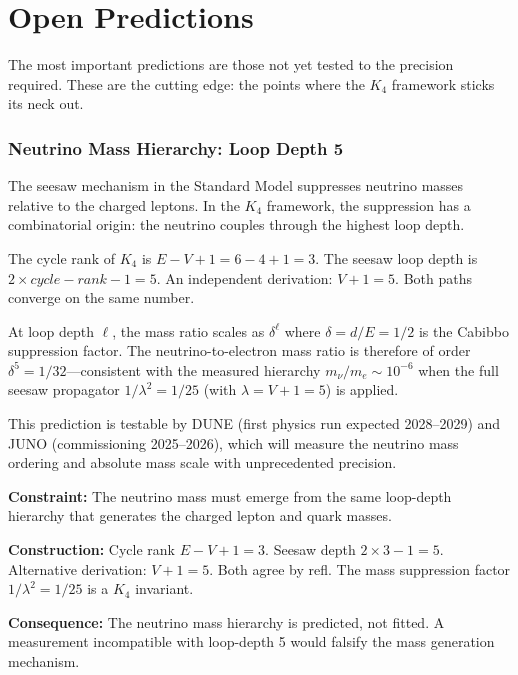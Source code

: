 \documentclass[11pt,a4paper]{book}
\def\texttt#1{#1}%
\def\text#1{#1}%
\begin{document}
\section*{Open Predictions}

The most important predictions are those not yet tested to the precision required. These are the cutting edge: the points where the $K_4$ framework sticks its neck out.

\subsubsection*{Neutrino Mass Hierarchy: Loop Depth 5}

The seesaw mechanism in the Standard Model suppresses neutrino masses relative to the charged leptons. In the $K_4$ framework, the suppression has a combinatorial origin: the neutrino couples through the highest loop depth.

The cycle rank of $K_4$ is $E - V + 1 = 6 - 4 + 1 = 3$. The seesaw loop depth is $2 \times \text{cycle-rank} - 1 = 5$. An independent derivation: $V + 1 = 5$. Both paths converge on the same number.

At loop depth $\ell$, the mass ratio scales as $\delta^\ell$ where $\delta = d/E = 1/2$ is the Cabibbo suppression factor. The neutrino-to-electron mass ratio is therefore of order $\delta^5 = 1/32$---consistent with the measured hierarchy $m_\nu / m_e \sim 10^{-6}$ when the full seesaw propagator $1/\lambda^2 = 1/25$ (with $\lambda = V + 1 = 5$) is applied.

This prediction is testable by DUNE (first physics run expected 2028--2029) and JUNO (commissioning 2025--2026), which will measure the neutrino mass ordering and absolute mass scale with unprecedented precision.

\textbf{Constraint:} The neutrino mass must emerge from the same loop-depth hierarchy that generates the charged lepton and quark masses.

\textbf{Construction:} Cycle rank $E - V + 1 = 3$. Seesaw depth $2 \times 3 - 1 = 5$. Alternative derivation: $V + 1 = 5$. Both agree by \texttt{refl}. The mass suppression factor $1/\lambda^2 = 1/25$ is a $K_4$ invariant.

\textbf{Consequence:} The neutrino mass hierarchy is predicted, not fitted. A measurement incompatible with loop-depth 5 would falsify the mass generation mechanism.
\end{document}
